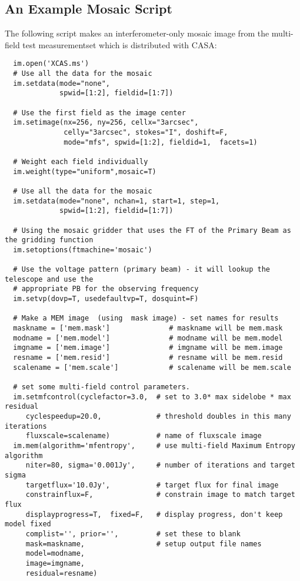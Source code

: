 \subsection{An Example Mosaic Script}
\label{section:imtool.mosaic.example}

The following script makes an interferometer-only mosaic image from
the multi-field test measurementset which is distributed with CASA:

\small
\begin{verbatim}
  im.open('XCAS.ms')
  # Use all the data for the mosaic
  im.setdata(mode="none",
             spwid=[1:2], fieldid=[1:7])

  # Use the first field as the image center
  im.setimage(nx=256, ny=256, cellx="3arcsec",
              celly="3arcsec", stokes="I", doshift=F,
              mode="mfs", spwid=[1:2], fieldid=1,  facets=1)

  # Weight each field individually
  im.weight(type="uniform",mosaic=T)

  # Use all the data for the mosaic
  im.setdata(mode="none", nchan=1, start=1, step=1,
             spwid=[1:2], fieldid=[1:7])

  # Using the mosaic gridder that uses the FT of the Primary Beam as the gridding function
  im.setoptions(ftmachine='mosaic')

  # Use the voltage pattern (primary beam) - it will lookup the telescope and use the
  # appropriate PB for the observing frequency
  im.setvp(dovp=T, usedefaultvp=T, dosquint=F)

  # Make a MEM image  (using  mask image) - set names for results
  maskname = ['mem.mask']              # maskname will be mem.mask
  modname = ['mem.model']              # modname will be mem.model
  imgname = ['mem.image']              # imgname will be mem.image
  resname = ['mem.resid']              # resname will be mem.resid
  scalename = ['mem.scale']            # scalename will be mem.scale

  # set some multi-field control parameters.
  im.setmfcontrol(cyclefactor=3.0,  # set to 3.0* max sidelobe * max residual
     cyclespeedup=20.0,             # threshold doubles in this many iterations
     fluxscale=scalename)           # name of fluxscale image
  im.mem(algorithm='mfentropy',     # use multi-field Maximum Entropy algorithm
     niter=80, sigma='0.001Jy',     # number of iterations and target sigma
     targetflux='10.0Jy',           # target flux for final image
     constrainflux=F,               # constrain image to match target flux
     displayprogress=T,  fixed=F,   # display progress, don't keep model fixed
     complist='', prior='',         # set these to blank
     mask=maskname,                 # setup output file names
     model=modname,
     image=imgname,
     residual=resname)


\end{verbatim}
